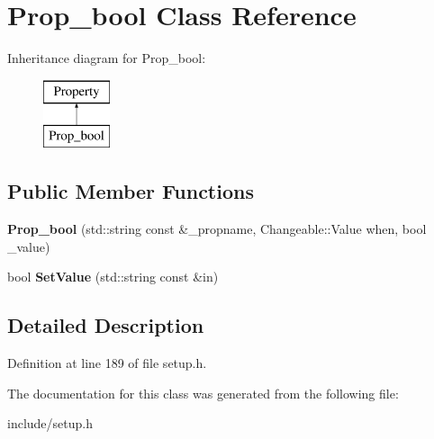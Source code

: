 \hypertarget{classProp__bool}{\section{Prop\-\_\-bool Class Reference}
\label{classProp__bool}
}
Inheritance diagram for Prop\-\_\-bool\-:\begin{figure}[H]
\begin{center}
\leavevmode
\includegraphics[height=2.000000cm]{classProp__bool}
\end{center}
\end{figure}
\subsection*{Public Member Functions}
\begin{DoxyCompactItemize}
\item 
\hypertarget{classProp__bool_ab70b5efc7550776962b20ecc1fd329ca}{{\bfseries Prop\-\_\-bool} (std\-::string const \&\-\_\-propname, Changeable\-::\-Value when, bool \-\_\-value)}\label{classProp__bool_ab70b5efc7550776962b20ecc1fd329ca}

\item 
\hypertarget{classProp__bool_aed3bf08dc9a6f2973d7e24cc6407796a}{bool {\bfseries Set\-Value} (std\-::string const \&in)}\label{classProp__bool_aed3bf08dc9a6f2973d7e24cc6407796a}

\end{DoxyCompactItemize}


\subsection{Detailed Description}


Definition at line 189 of file setup.\-h.



The documentation for this class was generated from the following file\-:\begin{DoxyCompactItemize}
\item 
include/setup.\-h\end{DoxyCompactItemize}
